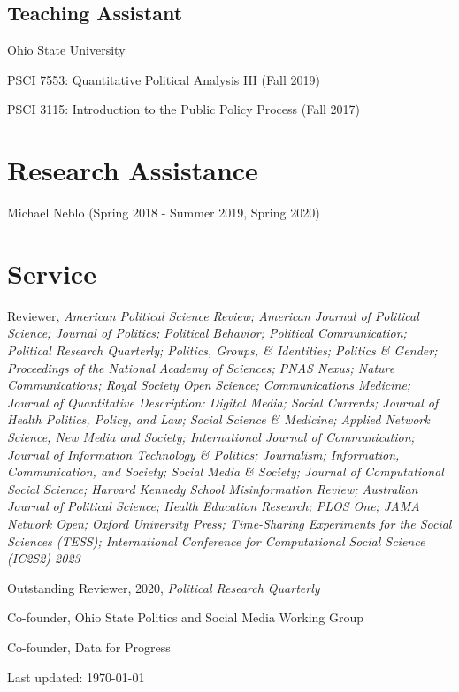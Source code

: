 \documentclass[letterpaper]{article}
\renewenvironment{itemize}{
  \begin{list}{}{
    \setlength{\leftmargin}{1.5em}
  }
}{
  \end{list}
}
\begin{document}
\subsection*{Teaching Assistant}

\begin{itemize}
\item Ohio State University 
\begin{itemize}
\item PSCI 7553: Quantitative Political Analysis III (Fall 2019)
\item PSCI 3115: Introduction to the Public Policy Process (Fall 2017)
\end{itemize}
\end{itemize}

\section*{Research Assistance}
\begin{itemize}
\item  Michael Neblo (Spring 2018 - Summer 2019, Spring 2020)
\end{itemize}

\section*{Service}

\begin{itemize}
\item Reviewer, \textit{American Political Science Review; American Journal of Political Science; Journal of Politics; Political Behavior; Political Communication; Political Research Quarterly; Politics, Groups, \& Identities; Politics \& Gender; Proceedings of the National Academy of Sciences; PNAS Nexus; Nature Communications; Royal Society Open Science; Communications Medicine; Journal of Quantitative Description: Digital Media; Social Currents; Journal of Health Politics, Policy, and Law; Social Science \& Medicine; Applied Network Science; New Media and Society; International Journal of Communication; Journal of Information Technology \& Politics; Journalism; Information, Communication, and Society; Social Media \& Society; Journal of Computational Social Science; Harvard Kennedy School Misinformation Review; Australian Journal of Political Science; Health Education Research; PLOS One; JAMA Network Open; Oxford University Press; Time-Sharing Experiments for the Social Sciences (TESS); International Conference for Computational Social Science (IC2S2) 2023}
\begin{itemize}
Outstanding Reviewer, 2020, \textit{Political Research Quarterly}
\end{itemize}
\item Co-founder, Ohio State Politics and Social Media Working Group
\item Co-founder, Data for Progress
\end{itemize}

\begin{center}
  \begin{footnotesize}
    Last updated: \today
      \end{footnotesize}
\end{center}
\end{document}
